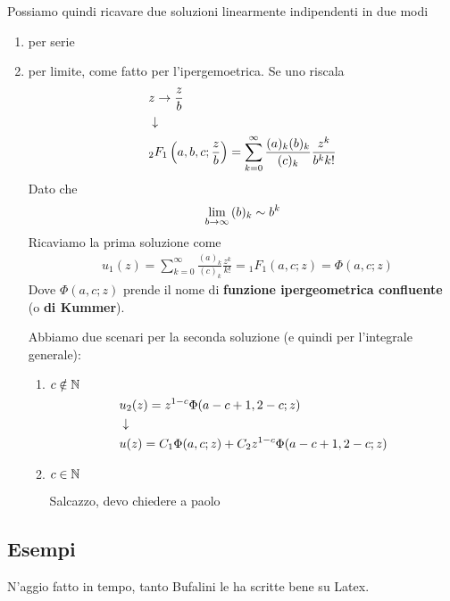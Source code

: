 Possiamo quindi ricavare due soluzioni linearmente indipendenti in due modi
\begin{enumerate}
	\item per serie
	\item per limite, come fatto per l'ipergemoetrica. Se uno riscala
	\begin{align}
		&z \to \frac{z}{b} \\ &\downarrow \nonumber \\
		&{}_2F_1 \left( a,b,c; \frac{z}{b} \right) = \sum_{k=0}^{\infty} \frac{(a)_k(b)_k}{(c)_k}\frac{z^k}{b^kk!}
	\end{align}
	Dato che
	\begin{align}
		\underset{b \rightarrow \infty}{\lim} \, (b)_k \sim b^k
	\end{align}
	Ricaviamo la prima soluzione come
	\begin{align}
		&u_1(z) = \sum_{k=0}^{\infty} \frac{(a)_k}{(c)_k}\frac{z^k}{k!} = {}_1F_1(a,c;z) = \Phi(a,c;z)
	\end{align}
	Dove $\Phi(a,c;z)$ prende il nome di \textbf{funzione ipergeometrica confluente} (o\textbf{ di Kummer}).
	
	\newpage
	
	Abbiamo due scenari per la seconda soluzione (e quindi per l'integrale generale):
	\begin{enumerate}
		\item $c \notin \mathbb{N}$
		\begin{align}
			&u_2(z) = z^{1-c}\Phi(a-c+1, 2-c;z) \\ &\downarrow \nonumber \\
			&u(z) = C_1\Phi(a,c;z) + C_2 z^{1-c}\Phi(a-c+1, 2-c;z)
		\end{align}
		\item $c \in \mathbb{N}$
		
		Salcazzo, devo chiedere a paolo
	\end{enumerate}
\end{enumerate}

\newpage
\subsection{Esempi}
N'aggio fatto in tempo, tanto Bufalini le ha scritte bene su Latex.